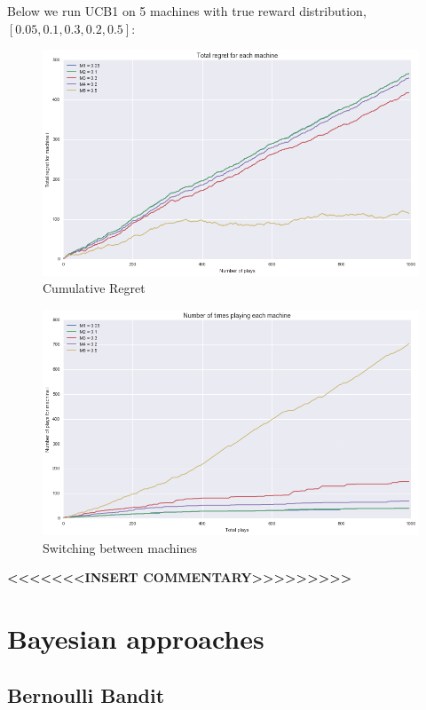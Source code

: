 \documentclass{article}
\begin{document}
Below we run UCB1 on 5 machines with true reward distribution, $[0.05,0.1,0.3,0.2,0.5]$:

\begin{figure}[H]
\centering
\includegraphics[scale=0.5]{UCB_regret.png}
\caption{Cumulative Regret}
\end{figure}


\begin{figure}[H]
\centering
\includegraphics[scale=0.5]{UCB_num_plays.png}
\caption{Switching between machines}
\end{figure}

\textbf{<<<<<<<INSERT COMMENTARY>>>>>>>>>}

\section{Bayesian approaches}

\subsection{Bernoulli Bandit}
\end{document}
